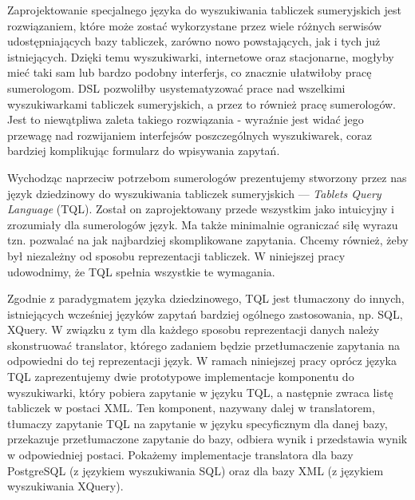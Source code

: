 Zaprojektowanie specjalnego języka do wyszukiwania tabliczek sumeryjskich jest rozwiązaniem, które może zostać wykorzystane przez wiele różnych serwisów udostępniających bazy tabliczek, zarówno nowo powstających, jak i tych już istniejących. Dzięki temu wyszukiwarki, internetowe oraz stacjonarne, mogłyby mieć taki sam lub bardzo podobny interferjs, co znacznie ułatwiłoby pracę sumerologom. DSL pozwoliłby usystematyzować prace nad wszelkimi wyszukiwarkami tabliczek sumeryjskich, a przez to również pracę sumerologów. Jest to niewątpliwa zaleta takiego rozwiązania - wyraźnie jest widać jego przewagę nad rozwijaniem interfejsów poszczególnych wyszukiwarek, coraz bardziej komplikując formularz do wpisywania zapytań.





Wychodząc naprzeciw potrzebom sumerologów prezentujemy stworzony przez nas język dziedzinowy do wyszukiwania tabliczek sumeryjskich --- \textit{Tablets Query Language} (TQL). Został on zaprojektowany przede wszystkim jako intuicyjny i zrozumiały dla sumerologów język. Ma także minimalnie ograniczać siłę wyrazu tzn. pozwalać na jak najbardziej skomplikowane zapytania. Chcemy również, żeby był niezależny od sposobu reprezentacji tabliczek. W niniejszej pracy udowodnimy, że TQL spełnia wszystkie te wymagania. 

Zgodnie z paradygmatem języka dziedzinowego, TQL jest tłumaczony do innych, istniejących wcześniej języków zapytań bardziej ogólnego zastosowania, np. SQL, XQuery.
W związku z tym dla każdego sposobu reprezentacji danych należy skonstruować translator, 
którego zadaniem będzie przetłumaczenie zapytania na odpowiedni do tej reprezentacji język. 
W ramach niniejszej pracy oprócz języka TQL zaprezentujemy dwie prototypowe implementacje komponentu do wyszukiwarki, który pobiera zapytanie w języku TQL, a następnie zwraca listę tabliczek w postaci XML.
Ten komponent, nazywany dalej w translatorem, tłumaczy zapytanie TQL na zapytanie w języku specyficznym dla danej bazy, przekazuje przetłumaczone zapytanie do bazy, odbiera wynik i przedstawia wynik w odpowiedniej postaci. Pokażemy implementacje translatora dla bazy PostgreSQL (z językiem wyszukiwania SQL) oraz dla bazy XML (z językiem wyszukiwania XQuery).


